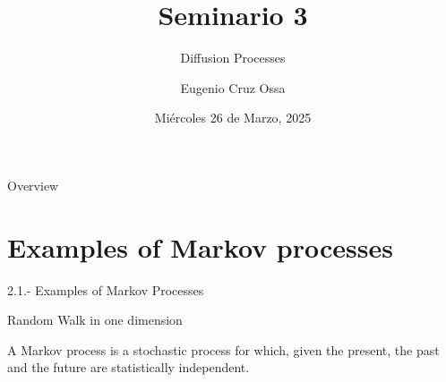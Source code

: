 \documentclass[aspectratio=169,xcolor=dvipsnames]{beamer}
\title{Seminario 3}
\subtitle{Diffusion Processes}
\author{Eugenio Cruz Ossa}
\institute
{
    Ingenier\'ia Civil Matem\'atica y Computacional \\
    Pontificia Universidad Cat\'olica %
}
\date{Mi\'ercoles 26 de Marzo, 2025} %
\begin{document}
\begin{frame}
    \titlepage
\end{frame}

\begin{frame}{Overview}
    \tableofcontents
\end{frame}

\section{Examples of Markov processes}

\begin{frame}
    \centering
    \Huge{2.1.- Examples of Markov Processes}
\end{frame}

\begin{frame}{Random Walk in one dimension}
    \begin{definition}
        A Markov process is a stochastic process for which, given the present, the past and the future are statistically independent.
    \end{definition}
\end{frame}
\end{document}
